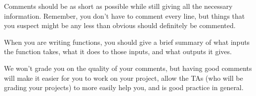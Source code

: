 \documentclass[10pt]{report}
\begin{document}
\par 
Comments should be as short as possible while still giving all the necessary information. Remember, you don’t have to comment every line, but things that you suspect might be any less than obvious should definitely be commented.

\par
When you are writing functions, you should give a brief summary of what inputs the function takes, what it does to those inputs, and what outputs it gives. 

\par 
We won’t grade you on the quality of your comments, but having good comments will make it easier for you to work on your project, allow the TAs (who will be grading your projects) to more easily help you, and is good practice in general.
 
\end{document}
